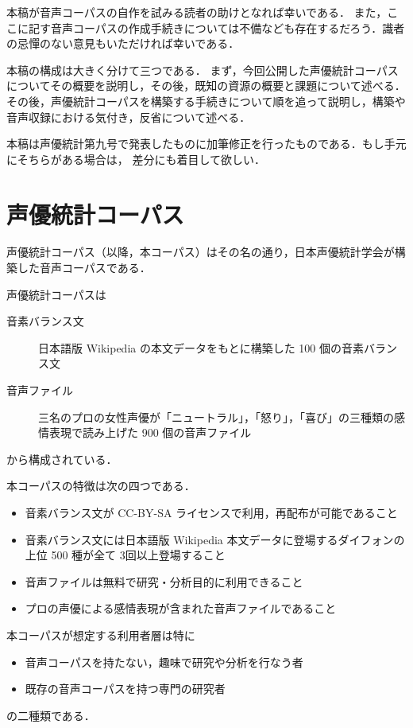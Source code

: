 \documentclass[final,10pt,twocolumn,3p,times,fleqn]{elsarticle}
\begin{document}
 本稿が音声コーパスの自作を試みる読者の助けとなれば幸いである．
 また，ここに記す音声コーパスの作成手続きについては不備なども存在するだろう．識者の忌憚のない意見もいただければ幸いである．
 
 本稿の構成は大きく分けて三つである．
 まず，今回公開した声優統計コーパスについてその概要を説明し，その後，既知の資源の概要と課題について述べる．
 その後，声優統計コーパスを構築する手続きについて順を追って説明し，構築や音声収録における気付き，反省について述べる．

 本稿は声優統計第九号で発表したもの\cite{vol9}に加筆修正を行ったものである．もし手元にそちらがある場合は，
 差分にも着目して欲しい．

 \section{声優統計コーパス}
 声優統計コーパス（以降，本コーパス）はその名の通り，日本声優統計学会が構築した音声コーパスである．

 声優統計コーパスは
 \begin{description}
  \item[音素バランス文] 日本語版 Wikipedia の本文データをもとに構築した 100 個の音素バランス文
  \item[音声ファイル] 三名のプロの女性声優が「ニュートラル」，「怒り」，「喜び」の三種類の感情表現で読み上げた 900 個の音声ファイル
 \end{description}
 から構成されている．

 本コーパスの特徴は次の四つである．
 \begin{itemize}
  \item 音素バランス文が CC-BY-SA ライセンスで利用，再配布が可能であること
  \item 音素バランス文には日本語版 Wikipedia 本文データに登場するダイフォンの上位 500 種が全て 3回以上登場すること
  \item 音声ファイルは無料で研究・分析目的に利用できること
  \item プロの声優による感情表現が含まれた音声ファイルであること
 \end{itemize}

 本コーパスが想定する利用者層は特に
 \begin{itemize}
  \item 音声コーパスを持たない，趣味で研究や分析を行なう者
  \item 既存の音声コーパスを持つ専門の研究者
 \end{itemize}
 の二種類である．
\end{document}
